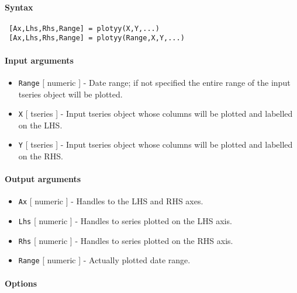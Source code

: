 


	\paragraph{Syntax}
 
 \begin{verbatim}
 [Ax,Lhs,Rhs,Range] = plotyy(X,Y,...)
 [Ax,Lhs,Rhs,Range] = plotyy(Range,X,Y,...)
 \end{verbatim}
 
 \paragraph{Input arguments}
 
 \begin{itemize}
 \item
   \texttt{Range} {[} numeric {]} - Date range; if not specified the
   entire range of the input tseries object will be plotted.
 \item
   \texttt{X} {[} tseries {]} - Input tseries object whose columns will
   be plotted and labelled on the LHS.
 \item
   \texttt{Y} {[} tseries {]} - Input tseries object whose columns will
   be plotted and labelled on the RHS.
 \end{itemize}
 
 \paragraph{Output arguments}
 
 \begin{itemize}
 \item
   \texttt{Ax} {[} numeric {]} - Handles to the LHS and RHS axes.
 \item
   \texttt{Lhs} {[} numeric {]} - Handles to series plotted on the LHS
   axis.
 \item
   \texttt{Rhs} {[} numeric {]} - Handles to series plotted on the RHS
   axis.
 \item
   \texttt{Range} {[} numeric {]} - Actually plotted date range.
 \end{itemize}
 
 \paragraph{Options}
 

